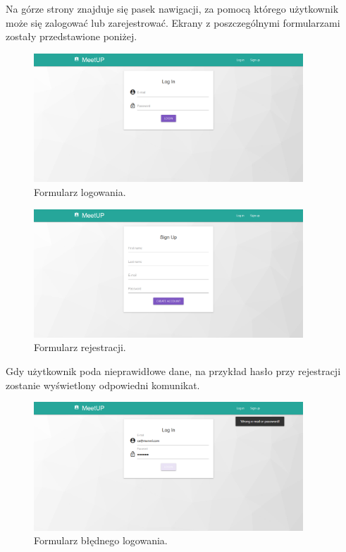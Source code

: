 \documentclass[12pt]{article}
\begin{document}
Na górze strony znajduje się pasek nawigacji, za pomocą którego użytkownik może się zalogować lub zarejestrować. Ekrany z poszczególnymi formularzami zostały przedstawione poniżej.

\begin{figure}[H]
\centering
\includegraphics[width=0.9\textwidth]{meetup_login.png}
\caption{Formularz logowania.}
\end{figure}

\begin{figure}[H]
\centering
\includegraphics[width=0.9\textwidth]{meetup_signup.png}
\caption{Formularz rejestracji.}
\end{figure}

Gdy użytkownik poda nieprawidłowe dane, na przykład hasło przy rejestracji zostanie wyświetlony odpowiedni komunikat.

\begin{figure}[H]
\centering
\includegraphics[width=0.9\textwidth]{meetup_login_error.png}
\caption{Formularz błędnego logowania.}
\end{figure}
\end{document}
